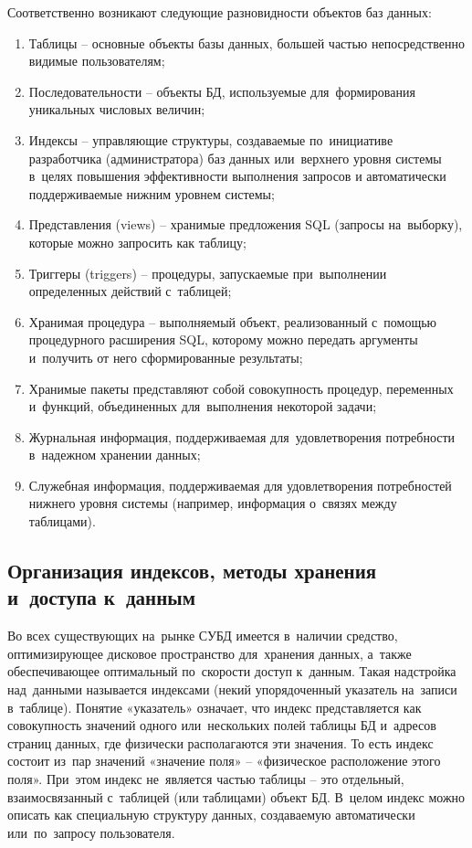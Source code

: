 \documentclass{ou}
\begin{document}
Соответственно возникают следующие разновидности объектов баз данных:
\begin{enumerate}[leftmargin=0em, itemindent=3.75em, nosep, label=\arabic*)]
\item Таблицы -- основные объекты базы данных, большей частью непосредственно видимые пользователям;
\item Последовательности -- объекты БД, используемые для~формирования уникальных числовых величин;
\item Индексы -- управляющие структуры, создаваемые по~инициативе разработчика (администратора) баз данных или~верхнего уровня системы в~целях повышения эффективности выполнения запросов и автоматически поддерживаемые нижним уровнем системы;
\item Представления (views) -- хранимые предложения SQL (запросы на~выборку), которые можно запросить как таблицу;
\item Триггеры (triggers) -- процедуры, запускаемые при~выполнении определенных действий с~таблицей;
\item Хранимая процедура -- выполняемый объект, реализованный с~помощью процедурного расширения SQL, которому можно передать аргументы и~получить от него сформированные результаты;
\item Хранимые пакеты представляют собой совокупность процедур, переменных и~функций, объединенных для~выполнения некоторой задачи;
\item Журнальная информация, поддерживаемая для~удовлетворения потребности в~надежном хранении данных;
\item Служебная информация, поддерживаемая для удовлетворения потребностей нижнего уровня системы (например, информация о~связях между таблицами).
\end{enumerate}
\subsection{Организация индексов, методы хранения и~доступа к~данным}
Во всех существующих на~рынке СУБД имеется в~наличии средство, оптимизирующее дисковое пространство для~хранения данных, а~также обеспечивающее оптимальный по~скорости доступ к~данным. Такая надстройка над~данными называется индексами (некий упорядоченный указатель на~записи в~таблице). Понятие «указатель» означает, что индекс представляется как совокупность значений одного или~нескольких полей таблицы БД и~адресов страниц данных, где физически располагаются эти значения. То есть индекс состоит из~пар значений «значение поля» -- «физическое расположение этого поля». При~этом индекс не~является частью таблицы -- это отдельный, взаимосвязанный с~таблицей (или таблицами) объект БД. В~целом индекс можно описать как специальную структуру данных, создаваемую автоматически или~по~запросу пользователя\cite{Sergeev2012}.
\end{document}
